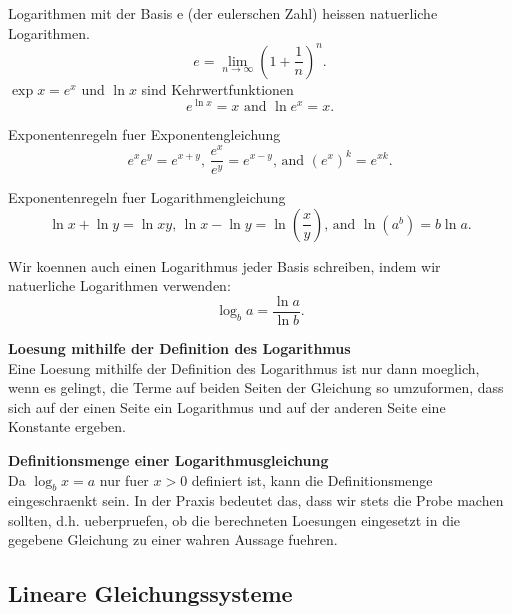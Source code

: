 \begin{multicols}{2}
    Logarithmen mit der Basis e (der eulerschen Zahl) heissen natuerliche Logarithmen.
    \begin{equation*}
        e = \lim\limits_{n\rightarrow\infty}{\left(1+\frac{1}{n}\right)^n}.
    \end{equation*}
    \noindent
    $\exp{x} = e^x$ und $\ln{x}$ sind Kehrwertfunktionen
    \begin{equation*}
        e^{\ln{x}} = x \text{ and } \ln{e^x} = x.
    \end{equation*}

    \noindent
    Exponentenregeln fuer Exponentengleichung
    \begin{equation*}
        e^xe^y = e^{x+y} \text{, } \frac{e^x}{e^y}=e^{x-y} \text{, and } \left(e^x\right)^k=e^{xk}.
    \end{equation*}

    \noindent
    Exponentenregeln fuer Logarithmengleichung
    \begin{equation*}
        \ln{x}+\ln{y} = \ln{xy} \text{, } \ln{x}-\ln{y} = \ln{\left(\frac{x}{y}\right)} \text{, and } \ln{\left(a^b\right)} = b\ln{a}.
    \end{equation*}

    \noindent
    Wir koennen auch einen Logarithmus jeder Basis schreiben, indem wir natuerliche Logarithmen verwenden:
    \begin{equation*}
        \log_{b}{a} = \frac{\ln{a}}{\ln{b}}.
    \end{equation*}

    \textbf{Loesung mithilfe der Definition des Logarithmus}\\
    Eine Loesung mithilfe der Definition des Logarithmus ist nur dann moeglich, wenn es gelingt, die Terme auf beiden Seiten der Gleichung so umzuformen, dass sich auf der einen Seite ein Logarithmus und auf der anderen Seite eine Konstante ergeben.

    \textbf{Definitionsmenge einer Logarithmusgleichung }\\
    Da $\log_{b}x = a$  nur fuer $x > 0$ definiert ist, kann die Definitionsmenge eingeschraenkt sein.
    In der Praxis bedeutet das, dass wir stets die Probe machen sollten, d.h. ueberpruefen, ob die berechneten Loesungen eingesetzt in die gegebene Gleichung zu einer wahren Aussage fuehren.


    \subsection{Lineare Gleichungssysteme}
    \vspace{-4mm}

\end{multicols}
